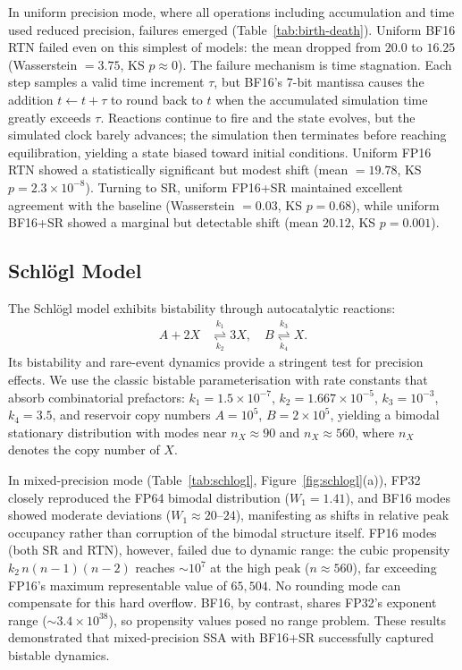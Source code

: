 \documentclass{article}
\begin{document}
In uniform precision mode, where all operations including accumulation and time used reduced precision, failures emerged (Table~\ref{tab:birth-death}). Uniform BF16 RTN failed even on this simplest of models: the mean dropped from $20.0$ to $16.25$ (Wasserstein $= 3.75$, KS $p \approx 0$). The failure mechanism is time stagnation. Each step samples a valid time increment $\tau$, but BF16's 7-bit mantissa causes the addition $t \leftarrow t + \tau$ to round back to $t$ when the accumulated simulation time greatly exceeds $\tau$. Reactions continue to fire and the state evolves, but the simulated clock barely advances; the simulation then terminates before reaching equilibration, yielding a state biased toward initial conditions. Uniform FP16 RTN showed a statistically significant but modest shift (mean $= 19.78$, KS $p = 2.3 \times 10^{-8}$). Turning to SR, uniform FP16+SR maintained excellent agreement with the baseline (Wasserstein $= 0.03$, KS $p = 0.68$), while uniform BF16+SR showed a marginal but detectable shift (mean $20.12$, KS $p = 0.001$). 


\subsection{Schl\"{o}gl Model}

The Schl\"{o}gl model \cite{schlogl1972} exhibits bistability through autocatalytic reactions:
\begin{align*}
    A + 2X &\underset{k_2}{\overset{k_1}{\rightleftharpoons}} 3X, \quad B \underset{k_4}{\overset{k_3}{\rightleftharpoons}} X.
\end{align*}
Its bistability and rare-event dynamics provide a stringent test for precision effects. We use the classic bistable parameterisation \cite{hybrid2} with rate constants that absorb combinatorial prefactors: $k_1 = 1.5\times10^{-7}$, $k_2 = 1.667\times10^{-5}$, $k_3 = 10^{-3}$, $k_4 = 3.5$, and reservoir copy numbers $A = 10^5$, $B = 2\times10^5$, yielding a bimodal stationary distribution with modes near $n_X \approx 90$ and $n_X \approx 560$, where $n_X$ denotes the copy number of $X$.

In mixed-precision mode (Table~\ref{tab:schlogl}, Figure~\ref{fig:schlogl}(a)), FP32 closely reproduced the FP64 bimodal distribution ($W_1 = 1.41$), and BF16 modes showed moderate deviations ($W_1 \approx 20$--$24$), manifesting as shifts in relative peak occupancy rather than corruption of the bimodal structure itself. FP16 modes (both SR and RTN), however, failed due to dynamic range: the cubic propensity $k_2 \,  n(n{-}1)(n{-}2)$ reaches $\sim\!10^7$ at the high peak ($n \approx 560$), far exceeding FP16's maximum representable value of $65{,}504$. No rounding mode can compensate for this hard overflow. BF16, by contrast, shares FP32's exponent range ($\sim\!3.4\times10^{38}$), so propensity values posed no range problem. These results demonstrated that mixed-precision SSA with BF16+SR successfully captured bistable dynamics.
\end{document}
